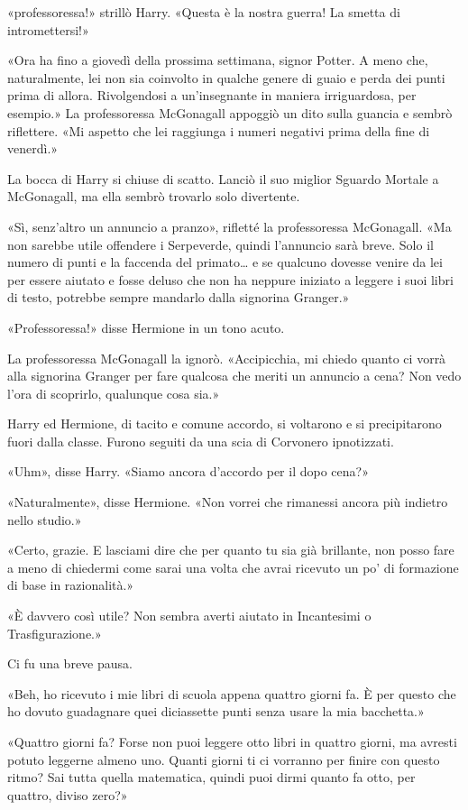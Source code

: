 «professoressa!» strillò Harry. «Questa è la nostra guerra! La smetta di intromettersi!»

«Ora ha fino a giovedì della prossima settimana, signor Potter. A meno che, naturalmente, lei non sia coinvolto in qualche genere di guaio e perda dei punti prima di allora. Rivolgendosi a un’insegnante in maniera irriguardosa, per esempio.» La professoressa McGonagall appoggiò un dito sulla guancia e sembrò riflettere. «Mi aspetto che lei raggiunga i numeri negativi prima della fine di venerdì.»

La bocca di Harry si chiuse di scatto. Lanciò il suo miglior Sguardo Mortale a McGonagall, ma ella sembrò trovarlo solo divertente.

«Sì, senz’altro un annuncio a pranzo», rifletté la professoressa McGonagall. «Ma non sarebbe utile offendere i Serpeverde, quindi l’annuncio sarà breve. Solo il numero di punti e la faccenda del primato… e se qualcuno dovesse venire da lei per essere aiutato e fosse deluso che non ha neppure iniziato a leggere i suoi libri di testo, potrebbe sempre mandarlo dalla signorina Granger.»

«Professoressa!» disse Hermione in un tono acuto.

La professoressa McGonagall la ignorò. «Accipicchia, mi chiedo quanto ci vorrà alla signorina Granger per fare qualcosa che meriti un annuncio a cena? Non vedo l’ora di scoprirlo, qualunque cosa sia.»

Harry ed Hermione, di tacito e comune accordo, si voltarono e si precipitarono fuori dalla classe. Furono seguiti da una scia di Corvonero ipnotizzati.

«Uhm», disse Harry. «Siamo ancora d’accordo per il dopo cena?»

«Naturalmente», disse Hermione. «Non vorrei che rimanessi ancora più indietro nello studio.»

«Certo, grazie. E lasciami dire che per quanto tu sia già brillante, non posso fare a meno di chiedermi come sarai una volta che avrai ricevuto un po’ di formazione di base in razionalità.»

«È davvero così utile? Non sembra averti aiutato in Incantesimi o Trasfigurazione.»

Ci fu una breve pausa.

«Beh, ho ricevuto i mie libri di scuola appena quattro giorni fa. È per questo che ho dovuto guadagnare quei diciassette punti senza usare la mia bacchetta.»

«Quattro giorni fa? Forse non puoi leggere otto libri in quattro giorni, ma avresti potuto leggerne almeno uno. Quanti giorni ti ci vorranno per finire con questo ritmo? Sai tutta quella matematica, quindi puoi dirmi quanto fa otto, per quattro, diviso zero?»

